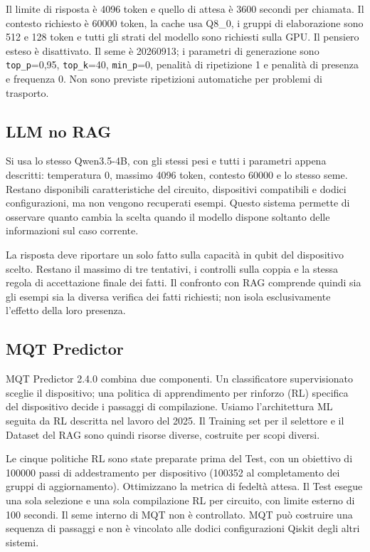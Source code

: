 Il limite di risposta è 4096 token e quello di attesa è 3600 secondi per
chiamata. Il contesto richiesto è 60000 token, la cache usa Q8\_0,
i gruppi di elaborazione sono 512 e 128 token e tutti gli strati del modello
sono richiesti sulla GPU. Il pensiero esteso è disattivato.
Il seme è 20260913; i parametri di generazione sono
\texttt{top\_p}=0,95, \texttt{top\_k}=40, \texttt{min\_p}=0,
penalità di ripetizione 1 e penalità di presenza e frequenza 0.
Non sono previste ripetizioni automatiche per problemi di trasporto.

\subsection{LLM no RAG}
Si usa lo stesso Qwen3.5-4B, con gli stessi pesi e tutti i parametri appena
descritti: temperatura 0, massimo 4096 token, contesto 60000 e lo stesso seme.
Restano disponibili caratteristiche del circuito, dispositivi compatibili
e dodici configurazioni, ma non vengono recuperati esempi.
Questo sistema permette di osservare quanto cambia la scelta quando
il modello dispone soltanto delle informazioni sul caso corrente.

La risposta deve riportare un solo fatto sulla capacità in qubit del
dispositivo scelto. Restano il massimo di tre tentativi, i controlli sulla
coppia e la stessa regola di accettazione finale dei fatti.
Il confronto con RAG comprende quindi sia gli esempi sia la diversa verifica
dei fatti richiesti; non isola esclusivamente l'effetto della loro presenza.

\subsection{MQT Predictor}
MQT Predictor 2.4.0 combina due componenti. Un classificatore supervisionato
sceglie il dispositivo; una politica di apprendimento per rinforzo (RL)
specifica del dispositivo decide i passaggi di compilazione.
Usiamo l'architettura ML seguita da RL descritta nel lavoro del 2025.
Il Training set per il selettore e il Dataset del RAG sono quindi risorse
diverse, costruite per scopi diversi.

Le cinque politiche RL sono state preparate prima del Test, con un obiettivo
di 100000 passi di addestramento per dispositivo (100352 al completamento
dei gruppi di aggiornamento). Ottimizzano la metrica di fedeltà attesa.
Il Test esegue una sola selezione e una sola compilazione RL per circuito,
con limite esterno di 100 secondi. Il seme interno di MQT non è controllato.
MQT può costruire una sequenza di passaggi e non è vincolato alle dodici
configurazioni Qiskit degli altri sistemi.

